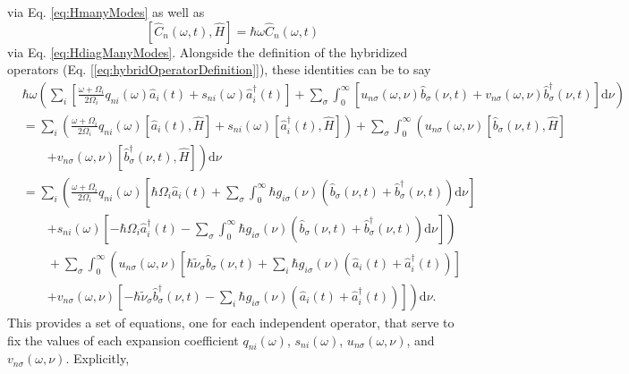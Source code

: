 via Eq. \eqref{eq:HmanyModes} as well as
\begin{equation}
\left[\hat{C}_n(\omega,t),\hat{H}\right] = \hbar\omega\hat{C}_n(\omega,t)
\end{equation}
via Eq. \eqref{eq:HdiagManyModes}. Alongside the definition of the hybridized operators (Eq. [\ref{eq:hybridOperatorDefinition}]), these identities can be to say
\begin{equation}
\begin{split}
&\hbar\omega\left(\sum_i\left[\frac{\omega + \Omega_i}{2\Omega_i}q_{ni}(\omega)\hat{a}_i(t) + s_{ni}(\omega)\hat{a}^\dagger_i(t)\right] + \sum_\sigma\int_0^\infty\left[u_{n\sigma}(\omega,\nu)\hat{b}_\sigma(\nu,t) + v_{n\sigma}(\omega,\nu)\hat{b}_\sigma^\dagger(\nu,t)\right]\mathrm{d}\nu\right)\\
&= \sum_i\left(\frac{\omega + \Omega_i}{2\Omega_i}q_{ni}(\omega)\left[\hat{a}_i(t),\hat{H}\right] + s_{ni}(\omega)\left[\hat{a}_i^\dagger(t),\hat{H}\right]\right) + \sum_\sigma\int_0^\infty\left(u_{n\sigma}(\omega,\nu)\left[\hat{b}_\sigma(\nu,t),\hat{H}\right]\right.\\
&\qquad\left. + v_{n\sigma}(\omega,\nu)\left[\hat{b}_\sigma^\dagger(\nu,t),\hat{H}\right]\right)\mathrm{d}\nu\\
&= \sum_i\left(\frac{\omega + \Omega_i}{2\Omega_i}q_{ni}(\omega)\left[\hbar\Omega_i\hat{a}_i(t) + \sum_\sigma\int_0^\infty\hbar g_{i\sigma}(\nu)\left(\hat{b}_\sigma(\nu,t) + \hat{b}_\sigma^\dagger(\nu,t)\right)\mathrm{d}\nu\right]\right.\\
&\qquad\left. + s_{ni}(\omega)\left[-\hbar\Omega_i\hat{a}_i^\dagger(t) - \sum_\sigma\int_0^\infty\hbar g_{i\sigma}(\nu)\left(\hat{b}_\sigma(\nu,t) + \hat{b}_\sigma^\dagger(\nu,t)\right)\mathrm{d}\nu\right]\right)\\
&\qquad + \sum_\sigma\int_0^\infty\left(u_{n\sigma}(\omega,\nu)\left[\hbar\tilde{\nu}_\sigma\hat{b}_\sigma(\nu,t) + \sum_i\hbar g_{i\sigma}(\nu)\left(\hat{a}_i(t) + \hat{a}_i^\dagger(t)\right)\right]\right.\\
&\qquad\left. + v_{n\sigma}(\omega,\nu)\left[-\hbar\tilde{\nu}_\sigma\hat{b}_\sigma^\dagger(\nu,t) - \sum_i\hbar g_{i\sigma}(\nu)\left(\hat{a}_i(t) + \hat{a}_i^\dagger(t)\right)\right] \right)\mathrm{d}\nu.
\end{split}
\end{equation}
This provides a set of equations, one for each independent operator, that serve to fix the values of each expansion coefficient $q_{ni}(\omega)$, $s_{ni}(\omega)$, $u_{n\sigma}(\omega,\nu)$, and $v_{n\sigma}(\omega,\nu)$. Explicitly,
